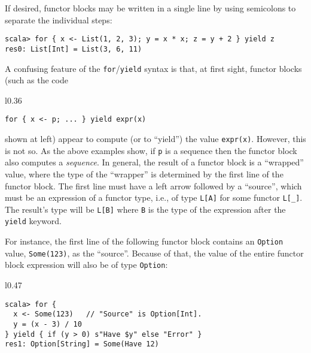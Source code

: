 If desired, functor blocks may be written in a single line by using
semicolons to separate the individual steps:
\begin{lstlisting}
scala> for { x <- List(1, 2, 3); y = x * x; z = y + 2 } yield z
res0: List[Int] = List(3, 6, 11)
\end{lstlisting}

A confusing feature of the \lstinline!for!/\lstinline!yield! syntax
is that, at first sight, functor blocks (such as the code\begin{wrapfigure}{l}{0.36\columnwidth}%
\vspace{-0.8\baselineskip}
\begin{lstlisting}
for { x <- p; ... } yield expr(x)
\end{lstlisting}

\vspace{-0.8\baselineskip}
\end{wrapfigure}%
 shown at left) appear to compute (or to \textsf{``}yield\textsf{''}) the value \lstinline!expr(x)!.
However, this is not so. As the above examples show, if \lstinline!p!
is a sequence then the functor block also computes a \emph{sequence}.
In general, the result of a functor block is a \textsf{``}wrapped\textsf{''} value,
where the type of the \textsf{``}wrapper\textsf{''} is determined by the first line
of the functor block. The first line must have a left arrow followed
by a \textsf{``}source\textsf{''}, which must be an expression
of a functor type, i.e., of type \lstinline!L[A]! for some functor
\lstinline!L[_]!. The result\textsf{'}s type will be \lstinline!L[B]! where
\lstinline!B! is the type of the expression after the \lstinline!yield!
keyword.

For instance, the first line of the following functor block contains
an \lstinline!Option! value, \lstinline!Some(123)!, as the \textsf{``}source\textsf{''}.
Because of that, the value of the entire functor block expression
will also be of type \lstinline!Option!:

\begin{wrapfigure}{l}{0.47\columnwidth}%
\vspace{-0.85\baselineskip}
\begin{lstlisting}
scala> for {
  x <- Some(123)   // "Source" is Option[Int].
  y = (x - 3) / 10
} yield { if (y > 0) s"Have $y" else "Error" }
res1: Option[String] = Some(Have 12)
\end{lstlisting}

\vspace{-1.2\baselineskip}
\end{wrapfigure}%


